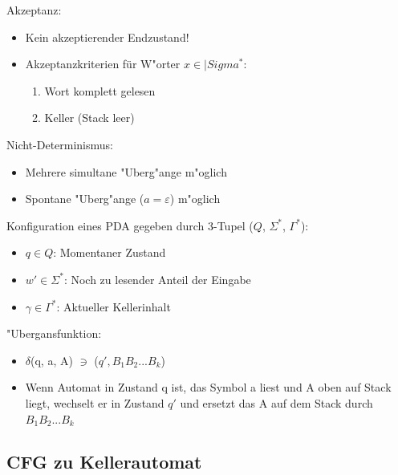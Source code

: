 \documentclass[11pt, a4paper]{scrartcl}
\begin{document}

\vspace{1em}

Akzeptanz:
\begin{itemize}
    \item Kein akzeptierender Endzustand!
    \item Akzeptanzkriterien für W"orter $x \in |Sigma^*$:
    \begin{enumerate}
        \item Wort komplett gelesen
        \item Keller (Stack leer)
    \end{enumerate}
\end{itemize}

\vspace{1em}

Nicht-Determinismus:
\begin{itemize}
    \item Mehrere simultane "Uberg"ange m"oglich
    \item Spontane "Uberg"ange ($a = \varepsilon$) m"oglich
\end{itemize}

\vspace{1em}

Konfiguration eines PDA gegeben durch 3-Tupel ($Q$, $\Sigma^*$, $\Gamma^*$):
\begin{itemize}
    \item $q \in Q$: Momentaner Zustand
    \item $w' \in \Sigma^*$: Noch zu lesender Anteil der Eingabe
    \item $\gamma \in \Gamma^*$: Aktueller Kellerinhalt
\end{itemize}

\vspace{1em}

"Ubergansfunktion:
\begin{itemize}
    \item $\delta$(q, a, A) $\ni$ ($q', B_1B_2...B_k$)
    \item Wenn Automat in Zustand q ist, das Symbol a liest und A oben auf Stack liegt, wechselt er in Zustand $q'$ und ersetzt das A auf dem Stack durch $B_1B_2...B_k$
\end{itemize}

\newpage


\subsection{CFG zu Kellerautomat}
\end{document}
